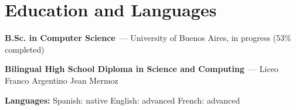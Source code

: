 \section*{Education and Languages}
\textbf{B.Sc. in Computer Science}~--- University of Buenos Aires, in progress (53\% completed)

\noindent \textbf{Bilingual High School Diploma in Science and Computing}~--- Liceo Franco Argentino Jean Mermoz

\noindent \textbf{Languages:} Spanish: native \;\textperiodcentered\; English: advanced \;\textperiodcentered\; French: advanced
